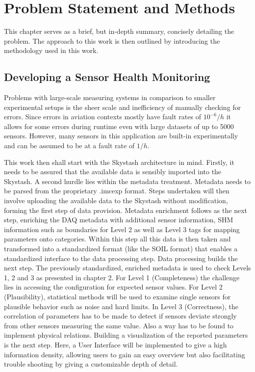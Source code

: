 \chapter{Problem Statement and Methods}

This chapter serves as a brief, but in-depth summary, concisely detailing the problem. The approach to this work is then outlined by introducing the methodology used in this work.

\section{Developing a Sensor Health Monitoring}

Problems with large-scale measuring systems in comparison to smaller experimental setups is the sheer scale and inefficiency of manually checking for errors. Since errors in aviation contexts mostly have fault rates of $10^{-6}/h$ it allows for some errors during runtime even with large datasets of up to 5000 sensors. However, many sensors in this application are built-in experimentally and can be assumed to be at a fault rate of $1/h$.

This work then shall start with the Skystash architecture in mind. Firstly, it needs to be assured that the available data is sensibly imported into the Skystash. A second hurdle lies within the metadata treatment. Metadata needs to be parsed from the proprietary .imcexp format. Steps undertaken will then involve uploading the available data to the Skystash without modification, forming the first step of data provision.
Metadata enrichment follows as the next step, enriching the DAQ metadata with additional sensor information, SHM information such as boundaries for Level 2 as well as Level 3 tags for mapping parameters onto categories. Within this step all this data is then taken and transformed into a standardized format (like the SOIL format) that enables a standardized interface to the data processing step.
Data processing builds the next step. The previously standardized, enriched metadata is used to check Levels 1, 2 and 3 as presented in chapter 2. For Level 1 (Completeness) the challenge lies in accessing the configuration for expected sensor values. For Level 2 (Plausibility), statistical methods will be used to examine single sensors for plausible behavior such as noise and hard limits. In Level 3 (Correctness), the correlation of parameters has to be made to detect if sensors deviate strongly from other sensors measuring the same value. Also a way has to be found to implement physical relations.
Building a visualization of the reported parameters is the next step. Here, a User Interface will be implemented to give a high information density, allowing users to gain an easy overview but also facilitating trouble shooting by giving a customizable depth of detail.

